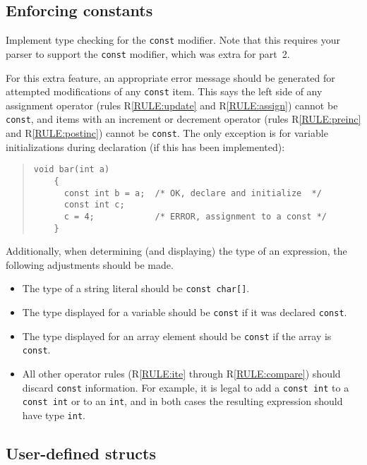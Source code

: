 \documentclass{article}
\newcounter{rule}
\newcommand{\parser}{2}
\begin{document}
\subsection{Enforcing constants}
\label{SEC:constants}

Implement type checking for the {\tt const} modifier.
Note that this requires your parser to support the {\tt const}
modifier, which was extra for part~\parser.

For this extra feature,
an appropriate error message should be generated
for attempted modifications of any {\tt const} item.
This says the left side of any assignment operator
(rules R\ref{RULE:update} and R\ref{RULE:assign})
cannot be {\tt const},
and items with an increment or decrement operator
(rules R\ref{RULE:preinc} and R\ref{RULE:postinc})
cannot be {\tt const}.
The only exception is for variable initializations during declaration
(if this has been implemented):
\begin{quote}
  \begin{lstlisting}[numbers=none]
    void bar(int a)
    {
      const int b = a;  /* OK, declare and initialize  */
      const int c;
      c = 4;            /* ERROR, assignment to a const */
    }
  \end{lstlisting}
\end{quote}

Additionally,
when determining (and displaying) the type of an expression,
the following adjustments should be made.
\begin{itemize}
  \item
    The type of a string literal should be {\tt const char[]}.

  \item
    The type displayed for a variable should be {\tt const}
    if it was declared {\tt const}.

  \item
    The type displayed for an array element should be {\tt const}
    if the array is {\tt const}.

  \item
    All other operator rules (R\ref{RULE:ite} through R\ref{RULE:compare})
    should discard {\tt const} information.
    For example,
    it is legal to add a {\tt const int} to a {\tt const int} or to an {\tt int},
    and in both cases the resulting expression should have type {\tt int}.


\end{itemize}


\subsection{User-defined structs}
\label{SEC:userstructs}
\end{document}
